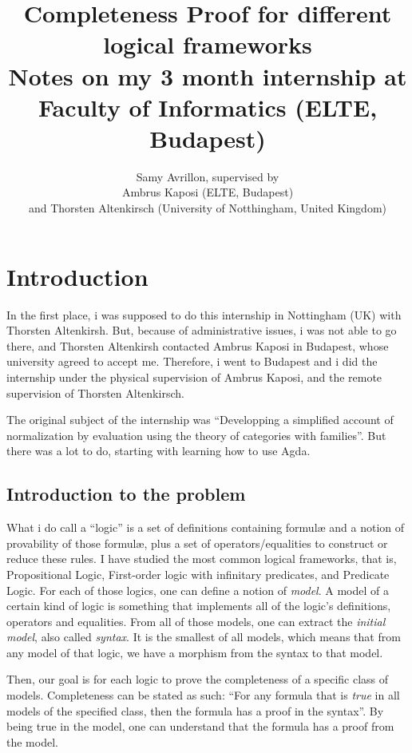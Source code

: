 \documentclass[10pt,a4paper]{article}
\title{Completeness Proof for different logical frameworks
	\\[1ex] \large Notes on my 3 month internship at Faculty of Informatics (ELTE, Budapest)}
\author{Samy Avrillon, supervised by
	\\[1ex] Ambrus Kaposi (ELTE, Budapest)
	\\[1ex] and Thorsten Altenkirsch (University of Notthingham, United Kingdom)}
\begin{document}
	\doparttoc
	\maketitle
	
	\hsep
	
	\tableofcontents
	
	\newpage
	
	
	\section{Introduction}
	
		In the first place, i was supposed to do this internship in Nottingham (UK) with Thorsten Altenkirsh. But, because of administrative issues, i was not able to go there, and Thorsten Altenkirsh contacted Ambrus Kaposi in Budapest, whose university agreed to accept me. Therefore, i went to Budapest and i did the internship under the physical supervision of Ambrus Kaposi, and the remote supervision of Thorsten Altenkirsch.
		
		The original subject of the internship was \enquote{Developping a simplified account of normalization by evaluation using the theory of categories with families}. But there was a lot to do, starting with learning how to use Agda.
		
		\subsection{Introduction to the problem}
			What i do call a \enquote{logic} is a set of definitions containing formulæ and a notion of provability of those formulæ, plus a set of operators/equalities to construct or reduce these rules. I have studied the most common logical frameworks, that is, Propositional Logic, First-order logic with infinitary predicates, and Predicate Logic. For each of those logics, one can define a notion of \emph{model}. A model of a certain kind of logic is something that implements all of the logic's definitions, operators and equalities. From all of those models, one can extract the \emph{initial model}, also called \emph{syntax}. It is the smallest of all models, which means that from any model of that logic, we have a morphism from the syntax to that model.
			
			Then, our goal is for each logic to prove the completeness of a specific class of models. Completeness can be stated as such: \enquote{For any formula that is \emph{true} in all models of the specified class, then the formula has a proof in the syntax}. By being true in the model, one can understand that the formula has a proof from the model.
\end{document}
